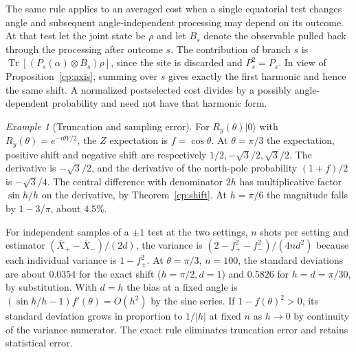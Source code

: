 \documentclass[aps,pra,onecolumn,superscriptaddress,nofootinbib,10pt]{revtex4-2}
\theoremstyle{definition}
\theoremstyle{remark}
\newtheorem{example}[theorem]{Example}
\begin{document}
The same rule applies to an averaged cost when a single equatorial test changes angle and subsequent angle-independent processing may depend on its outcome. At that test let the joint state be $\rho$ and let $B_s$ denote the observable pulled back through the processing after outcome $s$. The contribution of branch $s$ is $\operatorname{Tr}[(P_s(\alpha)\otimes B_s)\rho]$, since the site is discarded and $P_s^2=P_s$. In view of Proposition~\ref{cp:axis}, summing over $s$ gives exactly the first harmonic and hence the same shift. A normalized postselected cost divides by a possibly angle-dependent probability and need not have that harmonic form.

\begin{example}[Truncation and sampling error]\label{cp:shots}
For $R_y(\theta)|0\rangle$ with $R_y(\theta)=e^{-i\theta Y/2}$, the $Z$ expectation is $f=\cos\theta$. At $\theta=\pi/3$ the expectation, positive shift and negative shift are respectively $1/2,-\sqrt3/2,\sqrt3/2$. The derivative is $-\sqrt3/2$, and the derivative of the north-pole probability $(1+f)/2$ is $-\sqrt3/4$. The central difference with denominator $2h$ has multiplicative factor $\sin h/h$ on the derivative, by Theorem~\ref{cp:shift}. At $h=\pi/6$ the magnitude falls by $1-3/\pi$, about $4.5\%$.

For independent samples of a $\pm1$ test at the two settings, $n$ shots per setting and estimator $(\overline X_+-\overline X_-)/(2d)$, the variance is
$(2-f_+^2-f_-^2)/(4nd^2)$ because each individual variance is $1-f_\pm^2$. At $\theta=\pi/3$, $n=100$, the standard deviations are about $0.0354$ for the exact shift ($h=\pi/2,d=1$) and $0.5826$ for $h=d=\pi/30$, by substitution. With $d=h$ the bias at a fixed angle is $(\sin h/h-1)f'(\theta)=O(h^2)$ by the sine series. If $1-f(\theta)^2>0$, its standard deviation grows in proportion to $1/|h|$ at fixed $n$ as $h\to0$ by continuity of the variance numerator. The exact rule eliminates truncation error and retains statistical error.
\end{example}
\end{document}
